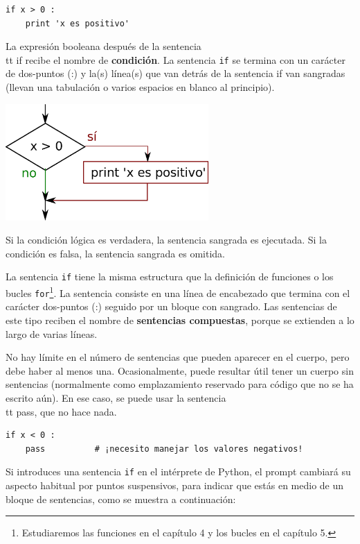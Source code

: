 \beforeverb
\begin{verbatim}
if x > 0 :
    print 'x es positivo'
\end{verbatim}
\afterverb
%
La expresión booleana después de la sentencia {\\tt if} recibe
el nombre de {\bf condición}. La sentencia {\tt if} se termina
con un carácter de dos-puntos (:) y la(s) línea(s) que van detrás de
la sentencia if van sangradas (llevan una tabulación o varios espacios en blanco al principio).

\beforefig
\centerline{\includegraphics[height=1.75in]{figs2/if.eps}}
\afterfig

Si la condición lógica es verdadera, la sentencia sangrada
es ejecutada. Si la condición es falsa,
la sentencia sangrada es omitida.


La sentencia {\tt if} tiene la misma estructura que la definición de funciones
o los bucles {\tt for}\footnote{Estudiaremos las funciones en el capítulo 4
y los bucles en el capítulo 5.}. La sentencia consiste en una línea de encabezado
que termina con el carácter dos-puntos (:)
seguido por un bloque con sangrado. Las sentencias de este tipo
reciben el nombre de {\bf sentencias compuestas}, porque se extienden
a lo largo de varias líneas.

No hay límite en el número de sentencias que pueden aparecer en el
cuerpo, pero debe haber al menos una.
Ocasionalmente, puede resultar útil tener un cuerpo sin sentencias
(normalmente como emplazamiento reservado para código que no se ha escrito aún). En ese
caso, se puede usar la sentencia {\\tt pass}, que no hace nada.


\beforeverb
\begin{verbatim}
if x < 0 :
    pass          # ¡necesito manejar los valores negativos!
\end{verbatim}
\afterverb
%
Si introduces una sentencia {\tt if} en el intérprete de Python, el prompt cambiará
su aspecto habitual por puntos suspensivos, para indicar que estás en medio de un bloque de sentencias, como
se muestra a continuación:

